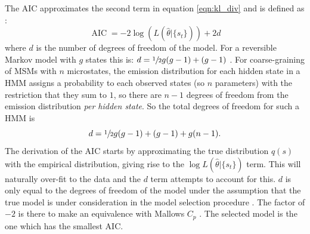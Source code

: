 The AIC approximates the second term in equation \ref{eqn:kl_div} and is defined as \cite{mclachlanFiniteMixtureModels2000}:
\begin{equation}\label{eqn:aic}
    \operatorname{AIC} = -2\log{\left(L\left(\hat{\theta}|\{s_t\}\right)\right)} + 2d
\end{equation}
where $d$ is the number of degrees of freedom of the model. For a reversible Markov model with $g$ states this is: $d = \sfrac{1}{2}g(g-1) + (g-1)$ \cite{trendelkamp-schroerEstimationUncertaintyReversible2015b}. For coarse-graining of MSMs with $n$ microstates, the emission distribution for each hidden state in a HMM assigns a probability to each observed states (so $n$ parameters) with the restriction that they sum to $1$, so there are $n-1$ degrees of freedom from the emission distribution \emph{per hidden state}. So the total  degrees of freedom for such a HMM is
\begin{equation}\label{eqn:hmm_dof}
    d = \sfrac{1}{2}g(g-1) + (g-1) + g(n-1). 
\end{equation}
The derivation of the AIC starts by approximating the true distribution $q(s)$ with the empirical distribution, giving rise to the $\log{L\left(\hat{\theta}|\{s_t\} \right)}$ term.  This will naturally over-fit to the data and the $d$ term attempts to account for this. $d$ is only equal to the degrees of freedom of the model under the assumption that the true model is under consideration in the model selection procedure \cite{ripley_1996}.  The factor of $-2$ is there to make an equivalence with Mallows $C_p$ \cite{friedman2001elements}. The selected model is the one which has the smallest AIC. 

